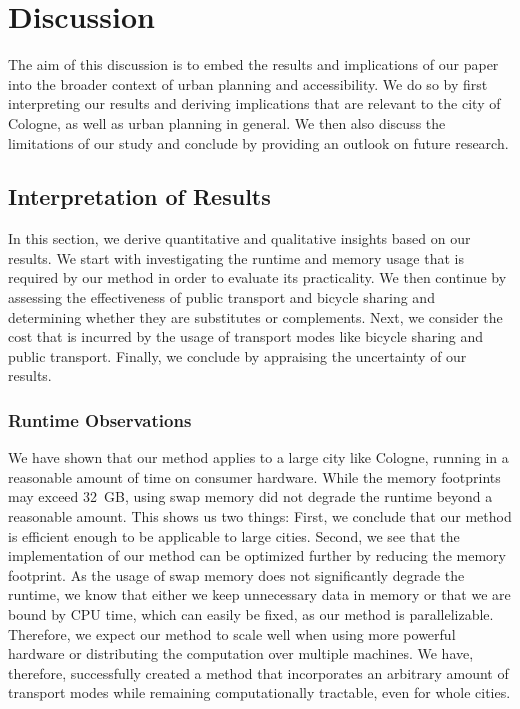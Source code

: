 \clearpage
\section{Discussion}
\label{sec:discussion}

The aim of this discussion is to embed the results and implications of our paper into the broader context of urban planning and accessibility.
We do so by first interpreting our results and deriving implications that are relevant to the city of Cologne, as well as urban planning in general.
We then also discuss the limitations of our study and conclude by providing an outlook on future research.

\subsection{Interpretation of Results}
\label{subsec:interpretation_of_results}

In this section, we derive quantitative and qualitative insights based on our results.
We start with investigating the runtime and memory usage that is required by our method in order to evaluate its practicality.
We then continue by assessing the effectiveness of public transport and bicycle sharing and determining whether they are substitutes or complements.
Next, we consider the cost that is incurred by the usage of transport modes like bicycle sharing and public transport.
Finally, we conclude by appraising the uncertainty of our results.

\subsubsection{Runtime Observations}
We have shown that our method applies to a large city like Cologne, running in a reasonable amount of time on consumer hardware.
While the memory footprints may exceed 32 GB, using swap memory did not degrade the runtime beyond a reasonable amount.
This shows us two things:
First, we conclude that our method is efficient enough to be applicable to large cities.
Second, we see that the implementation of our method can be optimized further by reducing the memory footprint.
As the usage of swap memory does not significantly degrade the runtime, we know that either we keep unnecessary data in memory or that we are bound by CPU time, which can easily be fixed, as our method is parallelizable.
Therefore, we expect our method to scale well when using more powerful hardware or distributing the computation over multiple machines.
We have, therefore, successfully created a method that incorporates an arbitrary amount of transport modes while remaining computationally tractable, even for whole cities.

